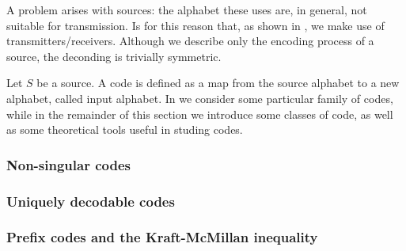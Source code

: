 \documentclass{subfiles}
\begin{document}
    A problem arises with sources: the alphabet these uses are, in general, 
        not suitable for transmission. Is for this reason that,
        as shown in , we make use of transmitters/receivers.
        Although we describe only the encoding process of a source, 
        the deconding is trivially symmetric.

    Let \(S\) be a source. A code is defined as a map from the source alphabet 
        to a new alphabet, called input alphabet. In 
        we consider some particular family of codes, 
        while in the remainder of this section we introduce some classes of code,
        as well as some theoretical tools useful in studing codes.

    \subsubsection{Non-singular codes}
    

    \subsubsection{Uniquely decodable codes}
    

    \subsubsection{Prefix codes and the Kraft-McMillan inequality}
    
\end{document}
